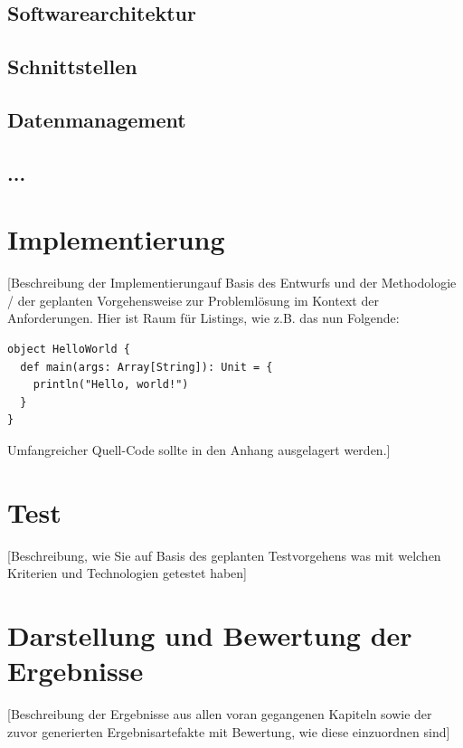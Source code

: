 \documentclass[oneside,bibliography=totocnumbered,BCOR=5mm]{scrbook}
\begin{document}
\section{Softwarearchitektur}
\section{Schnittstellen}
\section{Datenmanagement}
\section{...}



\chapter{Implementierung}

[Beschreibung der Implementierung\footnotemark auf Basis des Entwurfs und der Methodologie / der geplanten Vorgehensweise zur Probleml\"osung im Kontext der Anforderungen. Hier ist Raum f\"ur Listings, wie z.B. das nun Folgende:



\begin{lstlisting}[caption={Ein Beispiel: Hello World (Scala)}]
object HelloWorld {
  def main(args: Array[String]): Unit = {
    println("Hello, world!")
  }
}
\end{lstlisting}

Umfangreicher Quell-Code sollte in den Anhang ausgelagert werden.]


\chapter{Test}
[Beschreibung, wie Sie auf Basis des geplanten Testvorgehens was mit welchen Kriterien und Technologien getestet haben]

\chapter{Darstellung und Bewertung der Ergebnisse}
[Beschreibung der Ergebnisse aus allen voran gegangenen Kapiteln sowie der zuvor generierten Ergebnisartefakte mit Bewertung, wie diese einzuordnen sind]
\end{document}

